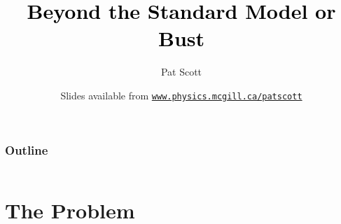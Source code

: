 \documentclass[xcolor=dvipsnames]{beamer}
\title[{\color[rgb]{0, 0, 0}Beyond the Standard Model or Bust}]{\textcolor{black}{Beyond the Standard Model or Bust}}
\author[Pat Scott -- March 3 -- Monash Physics Colloquium]{Pat Scott}
\institute{\small{McGill University / Imperial College London}}
\date[Mar 3, 2014]{Slides available from \color[rgb]{0.1, 0.0, 0.6} \href{http://www.physics.mcgill.ca/~patscott}{\tt www.physics.mcgill.ca/{\urltilda}patscott}}
\begin{document}
\maketitle


\begin{frame}
  \frametitle{Outline}
  \begin{columns}[t]
	\tableofcontents[sections={1}]
        \vspace{3mm}
	\tableofcontents[sections={2}]
        \vspace{3mm}
	\tableofcontents[sections={3}]
  \end{columns}	
\end{frame}

\section{The Problem}
\end{document}
